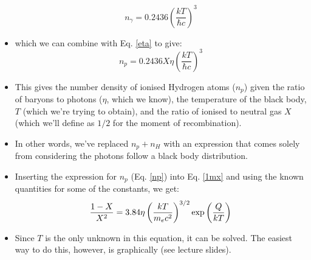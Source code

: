 \documentclass[11pt]{article}
\begin{document}
\begin{itemize}
\begin{equation}
    n_\gamma = 0.2436\left(\frac{k T}{\hbar c}\right)^3
\end{equation}
\item which we can combine with Eq. \ref{eta} to give:
\begin{equation}
    \label{np}
    n_p = 0.2436X\eta\left(\frac{k T}{\hbar c}\right)^3
\end{equation}
\item This gives the number density of ionised Hydrogen atoms ($n_p$) given the ratio of baryons to photons ($\eta$, which we know), the temperature of the black body, $T$ (which we're trying to obtain), and the ratio of ionised to neutral gas $X$ (which we'll define as $1/2$ for the moment of recombination).
\item In other words, we've replaced $n_p+n_H$ with an expression that comes solely from considering the photons follow a black body distribution.
\item Inserting the expression for $n_p$ (Eq. \ref{np}) into Eq. \ref{1mx} and using the known quantities for some of the constants, we get:
\begin{equation}
\frac{1-X}{X^2} = 3.84\eta\left(\frac{kT}{m_ec^2}\right)^{3/2}{\rm exp}\left(\frac{Q}{kT}\right)
\end{equation}
\item Since $T$ is the only unknown in this equation, it can be solved. The easiest way to do this, however, is graphically (see lecture slides).

\end{itemize}
\end{document}
